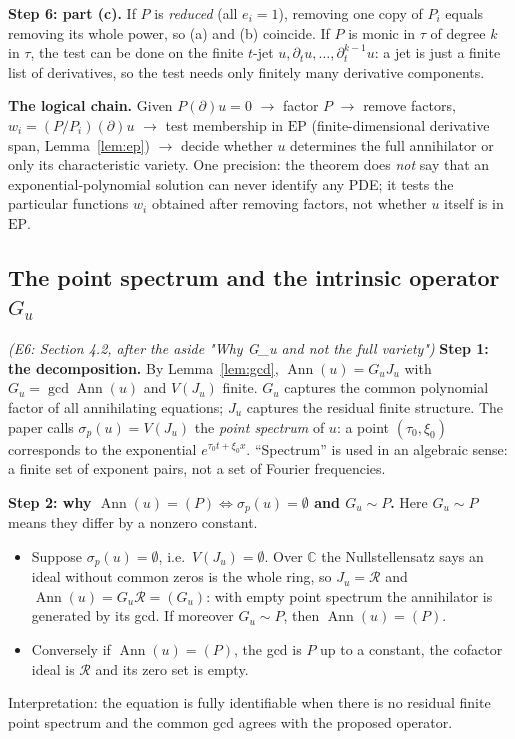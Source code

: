 \documentclass[11pt]{article}
\theoremstyle{plain}
\theoremstyle{definition}
\theoremstyle{remark}
\newcommand{\C}{\mathbb{C}}
\newcommand{\ring}{\mathcal{R}}            %
\DeclareMathOperator{\Ann}{Ann}             %
\newcommand{\Var}{V}                        %
\newcommand{\EP}{\mathrm{EP}}               %
\DeclareMathOperator{\Gcd}{gcd}
\begin{document}
\medskip\textbf{Step 6: part (c).} If $P$ is \emph{reduced} (all $e_i=1$), removing one copy of $P_i$ equals removing its whole power, so (a) and (b) coincide. If $P$ is monic in $\tau$ of degree $k$ in $\tau$, the test can be done on the finite $t$-jet $u,\partial_tu,\dots,\partial_t^{k-1}u$: a jet is just a finite list of derivatives, so the test needs only finitely many derivative components.

\medskip\textbf{The logical chain.} Given $P(\partial)u=0$ $\to$ factor $P$ $\to$ remove factors, $w_i=(P/P_i)(\partial)u$ $\to$ test membership in $\EP$ (finite-dimensional derivative span, Lemma~\ref{lem:ep}) $\to$ decide whether $u$ determines the full annihilator or only its characteristic variety. One precision: the theorem does \emph{not} say that an exponential-polynomial solution can never identify any PDE; it tests the particular functions $w_i$ obtained after removing factors, not whether $u$ itself is in $\EP$.

\subsection{The point spectrum and the intrinsic operator $G_u$}\label{expl:E6}
\noindent\emph{(E6: Section 4.2, after the aside "Why G\_u and not the full variety")}
\textbf{Step 1: the decomposition.} By Lemma~\ref{lem:gcd}, $\Ann(u)=G_uJ_u$ with $G_u=\Gcd\Ann(u)$ and $\Var(J_u)$ finite. $G_u$ captures the common polynomial factor of all annihilating equations; $J_u$ captures the residual finite structure. The paper calls $\sigma_p(u)=\Var(J_u)$ the \emph{point spectrum} of $u$: a point $(\tau_0,\xi_0)$ corresponds to the exponential $e^{\tau_0t+\xi_0x}$. ``Spectrum'' is used in an algebraic sense: a finite set of exponent pairs, not a set of Fourier frequencies.

\medskip\textbf{Step 2: why $\Ann(u)=(P)\iff\sigma_p(u)=\emptyset$ and $G_u\sim P$.} Here $G_u\sim P$ means they differ by a nonzero constant.
\begin{itemize}[nosep]
\item Suppose $\sigma_p(u)=\emptyset$, i.e.\ $\Var(J_u)=\emptyset$. Over $\C$ the Nullstellensatz says an ideal without common zeros is the whole ring, so $J_u=\ring$ and $\Ann(u)=G_u\ring=(G_u)$: with empty point spectrum the annihilator is generated by its gcd. If moreover $G_u\sim P$, then $\Ann(u)=(P)$.
\item Conversely if $\Ann(u)=(P)$, the gcd is $P$ up to a constant, the cofactor ideal is $\ring$ and its zero set is empty.
\end{itemize}
Interpretation: the equation is fully identifiable when there is no residual finite point spectrum and the common gcd agrees with the proposed operator.
\end{document}
